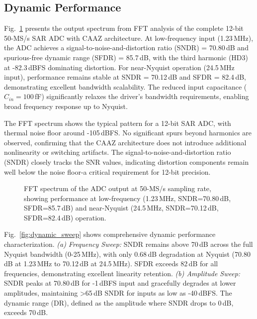 \documentclass[journal]{IEEEtran}
\begin{document}
\subsection{Dynamic Performance}
Fig.~\ref{fig:fft} presents the output spectrum from FFT analysis of the complete 12-bit 50-MS/s SAR ADC with CAAZ architecture. At low-frequency input (1.23\,MHz), the ADC achieves a signal-to-noise-and-distortion ratio (SNDR) = 70.80\,dB and spurious-free dynamic range (SFDR) = 85.7\,dB, with the third harmonic (HD3) at -82.3\,dBFS dominating distortion. For near-Nyquist operation (24.5\,MHz input), performance remains stable at SNDR = 70.12\,dB and SFDR = 82.4\,dB, demonstrating excellent bandwidth scalability. The reduced input capacitance ($C_{in}=100$\,fF) significantly relaxes the driver's bandwidth requirements, enabling broad frequency response up to Nyquist.

The FFT spectrum shows the typical pattern for a 12-bit SAR ADC, with thermal noise floor around -105\,dBFS. No significant spurs beyond harmonics are observed, confirming that the CAAZ architecture does not introduce additional nonlinearity or switching artifacts. The signal-to-noise-and-distortion ratio (SNDR) closely tracks the SNR values, indicating distortion components remain well below the noise floor-a critical requirement for 12-bit precision.

\begin{figure}[!t]
\centering
{}
\caption{FFT spectrum of the ADC output at 50-MS/s sampling rate, showing performance at low-frequency (1.23\,MHz, SNDR=70.80\,dB, SFDR=85.7\,dB) and near-Nyquist (24.5\,MHz, SNDR=70.12\,dB, SFDR=82.4\,dB) operation.}
\label{fig:fft}
\end{figure}

Fig.~\ref{fig:dynamic_sweep} shows comprehensive dynamic performance characterization. \textit{(a) Frequency Sweep:} SNDR remains above 70\,dB across the full Nyquist bandwidth (0-25\,MHz), with only 0.68\,dB degradation at Nyquist (70.80\,dB at 1.23\,MHz to 70.12\,dB at 24.5\,MHz). SFDR exceeds 82\,dB for all frequencies, demonstrating excellent linearity retention. \textit{(b) Amplitude Sweep:} SNDR peaks at 70.80\,dB for -1\,dBFS input and gracefully degrades at lower amplitudes, maintaining >65\,dB SNDR for inputs as low as -40\,dBFS. The dynamic range (DR), defined as the amplitude where SNDR drops to 0\,dB, exceeds 70\,dB.
\end{document}
